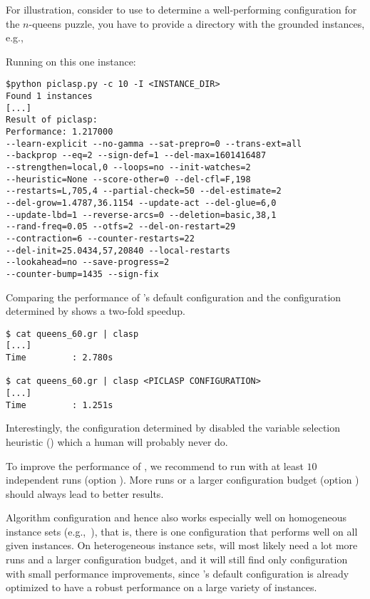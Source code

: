 \begin{example}
For illustration, consider to use \piclasp{} to determine a well-performing configuration for the $n$-queens puzzle, 
you have to provide a directory with the grounded instances, e.g., 

Running \piclasp{} on this one instance:
\begin{lstlisting}[numbers=none]
$python piclasp.py -c 10 -I <INSTANCE_DIR>
Found 1 instances
[...]
Result of piclasp:
Performance: 1.217000
--learn-explicit --no-gamma --sat-prepro=0 --trans-ext=all
--backprop --eq=2 --sign-def=1 --del-max=1601416487
--strengthen=local,0 --loops=no --init-watches=2
--heuristic=None --score-other=0 --del-cfl=F,198
--restarts=L,705,4 --partial-check=50 --del-estimate=2
--del-grow=1.4787,36.1154 --update-act --del-glue=6,0
--update-lbd=1 --reverse-arcs=0 --deletion=basic,38,1
--rand-freq=0.05 --otfs=2 --del-on-restart=29 
--contraction=6 --counter-restarts=22 
--del-init=25.0434,57,20840 --local-restarts 
--lookahead=no --save-progress=2
--counter-bump=1435 --sign-fix
\end{lstlisting}

Comparing the performance of \clasp{}'s default configuration
and the configuration determined by \piclasp{} shows a two-fold speedup.

\begin{lstlisting}[numbers=none]
$ cat queens_60.gr | clasp
[...]
Time         : 2.780s

$ cat queens_60.gr | clasp <PICLASP CONFIGURATION>
[...]
Time         : 1.251s
\end{lstlisting}

Interestingly, the configuration determined by \piclasp{} disabled the variable selection heuristic ()
which a human will probably never do.

\end{example}

\begin{note}
To improve the performance of \piclasp, 
we recommend to run \piclasp{} with at least $10$ independent \smac{} runs (option ).
More \smac{} runs or a larger configuration budget (option ) should always lead to better results.   
\end{note}

\begin{note}
Algorithm configuration and hence also \piclasp{} works especially well on homogeneous instance sets (e.g.,~\cite{gejokaobsascsc13a}),
that is, there is one configuration that performs well on all given instances.
On heterogeneous instance sets, \piclasp{} will most likely need a lot more \smac{} runs and a larger configuration budget,
and it will still find only configuration with small performance improvements, 
since \clasp{}'s default configuration is already optimized to have a robust performance on a large variety of instances.
\end{note}

